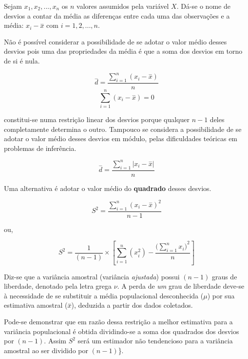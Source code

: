 \documentclass[
]{book}
\begin{document}
\hfill\break

Sejam \(x_{1}, x_{2}, ..., x_{n}\) os \(n\) valores assumidos pela variável \(X\). Dá-se o nome de desvios a contar da média as diferenças entre cada uma das observações e a média: \(x_{i} - \stackrel{-}{x}\) com \(i=1,2,...,n\).

\hfill\break

Não é possível considerar a possibilidade de se adotar o valor médio desses desvios pois uma das propriedades da média é que a soma dos desvios em torno de si é nula.

\hfill\break

\[
\stackrel{-}{d} = \frac{\sum _{i=1}^{n}\left(x_{i}-\stackrel{-}{x}\right)}{n}
\]
\[
\sum _{i=1}^{n}\left(x_{i}-\stackrel{-}{x}\right)=0
\]

\hfill\break

constitui-se numa restrição linear dos desvios porque qualquer \(n-1\) deles completamente determina o outro. Tampouco se considera a possibilidade de se adotar o valor médio desses desvios em módulo, pelas dificuldades teóricas em problemas de inferência.

\hfill\break

\[
\stackrel{-}{d}  = \frac{\sum _{i=1}^{n}\left|x_{i}-\stackrel{-}{x}\right|}{n}
\]

\hfill\break

Uma alternativa é adotar o valor médio do \textbf{quadrado} desses desvios.

\hfill\break

\[
S^{2}=\frac{\sum _{i=1}^{n}\left(x_{i}-\stackrel{-}{x}\right)^{2}}{n-1}
\]

\hfill\break

ou,

\hfill\break

\[
S^{2}=\frac{1}{(n-1)} \times \left[ \sum _{i=1}^{n} (x_{i}^{2}) - \frac{({\sum _{i=1}^{n}x_{i})}^{2} }{n}\right]
\]

\hfill\break

Diz-se que a variância amostral (variância \emph{ajustada}) possui \((n-1)\) graus de liberdade, denotado pela letra grega \(\nu\). A perda de \emph{um} grau de liberdade deve-se à necessidade de se substituir a média populacional desconhecida (\(\mu\)) por sua estimativa amostral (\(\stackrel{-}{x}\)), deduzida a partir dos dados coletados.

\hfill\break

Pode-se demonstrar que em razão dessa restrição a melhor estimativa para a variância populacional é obtida dividindo-se a soma dos quadrados dos desvios por \((n-1)\). Assim \(S^{2}\) será um estimador não tendencioso para a variância amostral ao ser dividido por \((n-1)\)\}.
\end{document}
